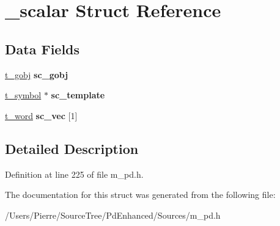 \hypertarget{struct__scalar}{\section{\-\_\-scalar Struct Reference}
\label{struct__scalar}
}
\subsection*{Data Fields}
\begin{DoxyCompactItemize}
\item 
\hypertarget{struct__scalar_ad57409a25a6fe7161b4c37c6f38d2659}{\hyperlink{struct__gobj}{t\-\_\-gobj} {\bfseries sc\-\_\-gobj}}\label{struct__scalar_ad57409a25a6fe7161b4c37c6f38d2659}

\item 
\hypertarget{struct__scalar_aa3dcf6e4178004509e9f4a3d75fb5554}{\hyperlink{struct__symbol}{t\-\_\-symbol} $\ast$ {\bfseries sc\-\_\-template}}\label{struct__scalar_aa3dcf6e4178004509e9f4a3d75fb5554}

\item 
\hypertarget{struct__scalar_a82e1e7b736772d6cc4c722c204b1ac18}{\hyperlink{unionword}{t\-\_\-word} {\bfseries sc\-\_\-vec} \mbox{[}1\mbox{]}}\label{struct__scalar_a82e1e7b736772d6cc4c722c204b1ac18}

\end{DoxyCompactItemize}


\subsection{Detailed Description}


Definition at line 225 of file m\-\_\-pd.\-h.



The documentation for this struct was generated from the following file\-:\begin{DoxyCompactItemize}
\item 
/\-Users/\-Pierre/\-Source\-Tree/\-Pd\-Enhanced/\-Sources/m\-\_\-pd.\-h\end{DoxyCompactItemize}
